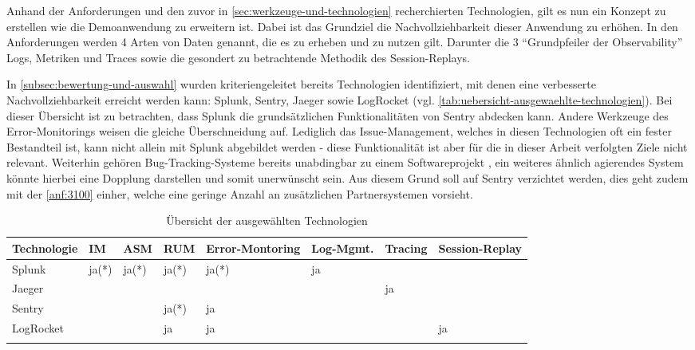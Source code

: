 % 

Anhand der Anforderungen und den zuvor in \autoref{sec:werkzeuge-und-technologien} recherchierten Technologien, gilt es nun ein Konzept zu erstellen wie die Demoanwendung zu erweitern ist. Dabei ist das Grundziel die Nachvollziehbarkeit dieser Anwendung zu erhöhen. In den Anforderungen werden 4 Arten von Daten genannt, die es zu erheben und zu nutzen gilt. Darunter die 3 \enquote{Grundpfeiler der Observability} Logs, Metriken und Traces sowie die gesondert zu betrachtende Methodik des Session-Replays.

In \autoref{subsec:bewertung-und-auswahl} wurden kriteriengeleitet bereits Technologien identifiziert, mit denen eine verbesserte Nachvollziehbarkeit erreicht werden kann: Splunk, Sentry, Jaeger sowie LogRocket (vgl. \autoref{tab:uebersicht-ausgewaehlte-technologien}). Bei dieser Übersicht ist zu betrachten, dass Splunk die grundsätzlichen Funktionalitäten von Sentry abdecken kann. Andere Werkzeuge des Error-Monitorings weisen die gleiche Überschneidung auf. Lediglich das Issue-Management, welches in diesen Technologien oft ein fester Bestandteil ist, kann nicht allein mit Splunk abgebildet werden - diese Funktionalität ist aber für die in dieser Arbeit verfolgten Ziele nicht relevant. Weiterhin gehören Bug-Tracking-Systeme bereits unabdingbar zu einem Softwareprojekt \cite{BugzillaITrackerAndOtherBugTrackers}, ein weiteres ähnlich agierendes System könnte hierbei eine Dopplung darstellen und somit unerwünscht sein. Aus diesem Grund soll auf Sentry verzichtet werden, dies geht zudem mit der \autoref{anf:3100} einher, welche eine geringe Anzahl an zusätzlichen Partnersystemen vorsieht.

\begingroup
\centering
\setlength{\LTleft}{-20cm plus -1fill}
\setlength{\LTright}{\LTleft}
\begin{longtable}{|p{4.10cm}|p{0.90cm}|p{0.90cm}|p{1.9cm}|p{1.75cm}|p{1.5cm}|p{1.4cm}|p{1.3cm}|}
\hline
Technologie & IM & ASM & RUM & Error-Montoring & Log-Mgmt. & Tracing & Session-Replay \\
\endhead
\hline
Splunk & ja(*) & ja(*) & ja(*) & ja(*) & ja &  &  \\
\hline
Jaeger &  &  &  &  &  & ja &  \\
\hline
Sentry &  &  & ja(*) & ja &  &  &  \\
\hline
LogRocket &  &  & ja & ja &  &  & ja \\
\hline
\caption{Übersicht der ausgewählten Technologien}
\label{tab:uebersicht-ausgewaehlte-technologien}
\end{longtable}
\endgroup

